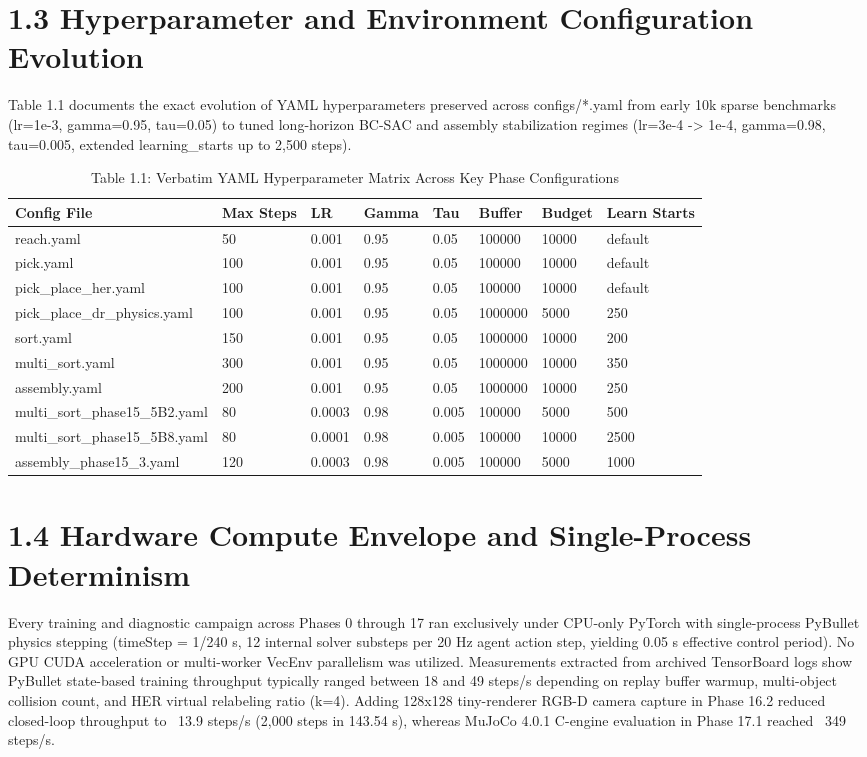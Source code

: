 \documentclass[11pt,a4paper,oneside]{book}
\begin{document}
\section{1.3 Hyperparameter and Environment Configuration Evolution}
Table 1.1 documents the exact evolution of YAML hyperparameters preserved across configs/*.yaml from early 10k sparse benchmarks (lr=1e-3, gamma=0.95, tau=0.05) to tuned long-horizon BC-SAC and assembly stabilization regimes (lr=3e-4 -> 1e-4, gamma=0.98, tau=0.005, extended learning\_starts up to 2,500 steps).

\begin{longtable}{l l l l l l l l}\caption{Table 1.1: Verbatim YAML Hyperparameter Matrix Across Key Phase Configurations}\\\toprule
Config File & Max Steps & LR & Gamma & Tau & Buffer & Budget & Learn Starts \\ \midrule \endhead
reach.yaml & 50 & 0.001 & 0.95 & 0.05 & 100000 & 10000 & default \\
pick.yaml & 100 & 0.001 & 0.95 & 0.05 & 100000 & 10000 & default \\
pick\_place\_her.yaml & 100 & 0.001 & 0.95 & 0.05 & 100000 & 10000 & default \\
pick\_place\_dr\_physics.yaml & 100 & 0.001 & 0.95 & 0.05 & 1000000 & 5000 & 250 \\
sort.yaml & 150 & 0.001 & 0.95 & 0.05 & 1000000 & 10000 & 200 \\
multi\_sort.yaml & 300 & 0.001 & 0.95 & 0.05 & 1000000 & 10000 & 350 \\
assembly.yaml & 200 & 0.001 & 0.95 & 0.05 & 1000000 & 10000 & 250 \\
multi\_sort\_phase15\_5B2.yaml & 80 & 0.0003 & 0.98 & 0.005 & 100000 & 5000 & 500 \\
multi\_sort\_phase15\_5B8.yaml & 80 & 0.0001 & 0.98 & 0.005 & 100000 & 10000 & 2500 \\
assembly\_phase15\_3.yaml & 120 & 0.0003 & 0.98 & 0.005 & 100000 & 5000 & 1000 \\
\bottomrule \end{longtable}
\section{1.4 Hardware Compute Envelope and Single-Process Determinism}
Every training and diagnostic campaign across Phases 0 through 17 ran exclusively under CPU-only PyTorch with single-process PyBullet physics stepping (timeStep = 1/240 s, 12 internal solver substeps per 20 Hz agent action step, yielding 0.05 s effective control period). No GPU CUDA acceleration or multi-worker VecEnv parallelism was utilized. Measurements extracted from archived TensorBoard logs show PyBullet state-based training throughput typically ranged between 18 and 49 steps/s depending on replay buffer warmup, multi-object collision count, and HER virtual relabeling ratio (k=4). Adding 128x128 tiny-renderer RGB-D camera capture in Phase 16.2 reduced closed-loop throughput to ~13.9 steps/s (2,000 steps in 143.54 s), whereas MuJoCo 4.0.1 C-engine evaluation in Phase 17.1 reached ~349 steps/s.
\end{document}
